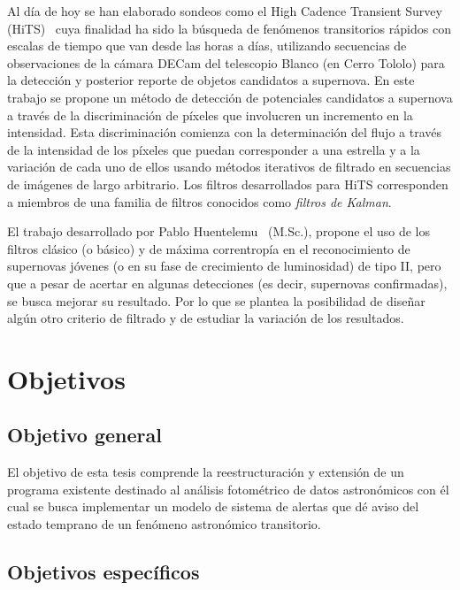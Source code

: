 Al d\'ia de hoy se han elaborado sondeos como el High Cadence Transient Survey (HiTS)~\cite{hits} cuya finalidad ha sido la b\'usqueda de fen\'omenos transitorios r\'apidos con escalas de tiempo que van desde las horas a d\'ias, utilizando secuencias de observaciones de la c\'amara DECam del telescopio Blanco (en Cerro Tololo) para la detecci\'on y posterior reporte de objetos candidatos a supernova. En este trabajo se propone un m\'etodo de detecci\'on de potenciales candidatos a supernova a trav\'es de la discriminaci\'on de p\'ixeles que involucren un incremento en la intensidad. Esta discriminaci\'on comienza con la determinaci\'on del flujo a trav\'es de la intensidad de los p\'ixeles que puedan corresponder a una estrella y a la variaci\'on de cada uno de ellos usando m\'etodos iterativos de filtrado en secuencias de im\'agenes de largo arbitrario. Los filtros desarrollados para HiTS corresponden a miembros de una familia de filtros conocidos como \textit{filtros de Kalman}.%
\bigskip


El trabajo desarrollado por Pablo Huentelemu~\cite{huentelemu} (M.Sc.), propone el uso de los filtros cl\'asico (o b\'asico) \cite{kalman} y de m\'axima correntrop\'ia \cite{chen} en el reconocimiento de supernovas j\'ovenes (o en su fase de crecimiento de luminosidad) de tipo II, pero que a pesar de acertar en algunas detecciones (es decir, supernovas confirmadas), se busca mejorar su resultado. Por lo que se plantea la posibilidad de dise\~nar alg\'un otro criterio de filtrado y de estudiar la variaci\'on de los resultados.
\bigskip


\section{Objetivos}
\subsection{Objetivo general}
El objetivo de esta tesis comprende la reestructuraci\'on y extensi\'on de un programa existente destinado al an\'alisis fotom\'etrico de datos astron\'omicos con \'el cual se busca implementar un modelo de sistema de alertas que d\'e aviso del estado temprano de un fen\'omeno astron\'omico transitorio. 
\bigskip

\subsection{Objetivos espec\'ificos}


